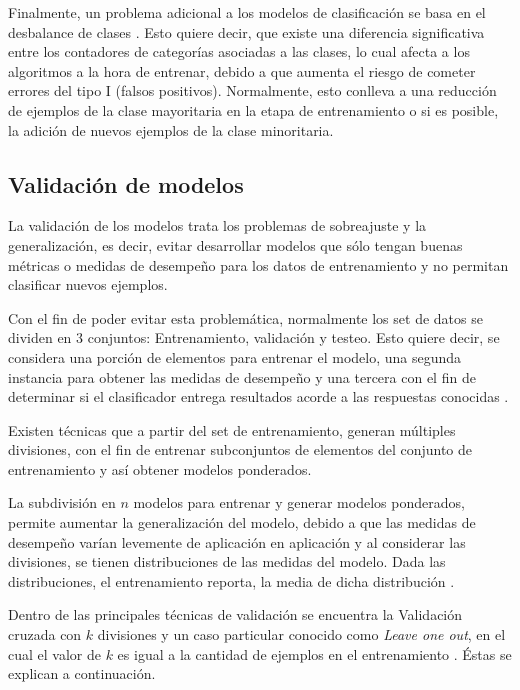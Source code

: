Finalmente, un problema adicional a los modelos de clasificación se basa en el desbalance de clases \cite{japkowicz2002class}. Esto quiere decir, que existe una diferencia significativa entre los contadores de categorías asociadas a las clases, lo cual afecta a los algoritmos a la hora de entrenar, debido a que aumenta el riesgo de cometer errores del tipo I (falsos positivos). Normalmente, esto conlleva a una reducción de ejemplos de la clase mayoritaria en la etapa de entrenamiento o si es posible, la adición de nuevos ejemplos de la clase minoritaria. 

\subsection{Validación de modelos}

La validación de los modelos trata los problemas de sobreajuste y la generalización, es decir, evitar desarrollar modelos que sólo tengan buenas métricas o medidas de desempeño para los datos de entrenamiento y no permitan clasificar nuevos ejemplos. 

Con el fin de poder evitar esta problemática, normalmente los set de datos se dividen en 3 conjuntos: Entrenamiento, validación y testeo. Esto quiere decir, se considera una porción de elementos para entrenar el modelo, una segunda instancia para obtener las medidas de desempeño y una tercera con el fin de determinar si el clasificador entrega resultados acorde a las respuestas conocidas \cite{kohavi1995study}.

Existen técnicas que a partir del set de entrenamiento, generan múltiples divisiones, con el fin de entrenar subconjuntos de elementos del conjunto de entrenamiento y así obtener modelos ponderados.

La subdivisión en $n$ modelos para entrenar y generar modelos ponderados, permite aumentar la generalización del modelo, debido a que las medidas de desempeño varían levemente de aplicación en aplicación y al considerar las divisiones, se tienen distribuciones de las medidas del modelo. Dada las distribuciones, el entrenamiento reporta, la media de dicha distribución \cite{golub1979generalized}. 

Dentro de las principales técnicas de validación se encuentra la Validación cruzada con $k$ divisiones \cite{golub1979generalized} y un caso particular conocido como \textit{Leave one out}, en el cual el valor de $k$ es igual a la cantidad de ejemplos en el entrenamiento \cite{vehtari2017practical}. Éstas se explican a continuación.

